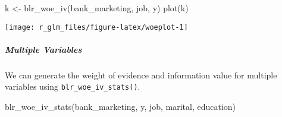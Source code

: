\documentclass[
]{article}
\newenvironment{Shaded}{\begin{snugshade}}{\end{snugshade}}
\newcommand{\FunctionTok}[1]{\textcolor[rgb]{0.00,0.00,0.00}{#1}}
\newcommand{\NormalTok}[1]{#1}
\newcommand{\OtherTok}[1]{\textcolor[rgb]{0.56,0.35,0.01}{#1}}
\begin{document}
\begin{Shaded}
\begin{Highlighting}[]
\NormalTok{k }\OtherTok{\textless{}{-}} \FunctionTok{blr\_woe\_iv}\NormalTok{(bank\_marketing, job, y)}
\FunctionTok{plot}\NormalTok{(k)}
\end{Highlighting}
\end{Shaded}

\begin{center}\texttt{[image: r\_glm\_files/figure-latex/woeplot-1]} \end{center}

\hypertarget{multiple-variables}{%
\subparagraph{Multiple Variables}\label{multiple-variables}}

We can generate the weight of evidence and information value for
multiple variables using \texttt{blr\_woe\_iv\_stats()}.

\begin{Shaded}
\begin{Highlighting}[]
\FunctionTok{blr\_woe\_iv\_stats}\NormalTok{(bank\_marketing, y, job, marital, education)}
\end{Highlighting}
\end{Shaded}
\end{document}
